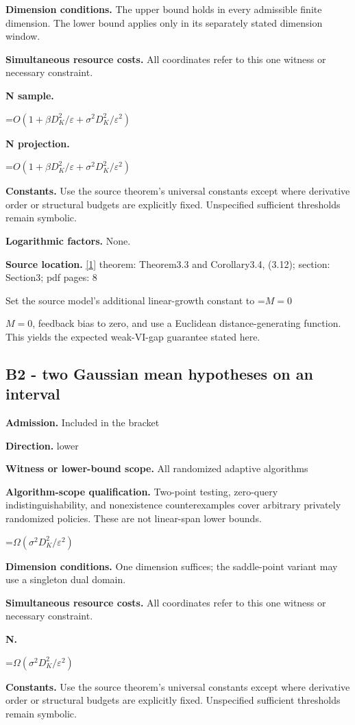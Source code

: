 \documentclass[10pt,a4paper]{article}
\newcommand{\AtlasMath}[1]{\par\begingroup\centering\setbox0=\hbox{$\displaystyle #1$}\ifdim\wd0>1.4\linewidth\typeout{ATLAS WIDE FORMULA: \the\wd0}\fi\ifdim\wd0>\linewidth\resizebox{\linewidth}{!}{\box0}\else\box0\fi\par\endgroup}
\newcommand{\AtlasInlineMath}[1]{\begingroup\setbox0=\hbox{$#1$}\ifdim\wd0>.4\linewidth\endgroup\AtlasMath{#1}\else\endgroup$#1$\fi}
\begin{document}
\textbf{Dimension conditions.} The upper bound holds in every admissible finite dimension. The lower bound applies only in its separately stated dimension window.

\textbf{Simultaneous resource costs.} All coordinates refer to this one witness or necessary constraint.

\textbf{N sample.}

\AtlasMath{O(1+\beta D_K^2/\varepsilon+\sigma^2D_K^2/\varepsilon^2)}
\textbf{N projection.}

\AtlasMath{O(1+\beta D_K^2/\varepsilon+\sigma^2D_K^2/\varepsilon^2)}
\textbf{Constants.} Use the source theorem’s universal constants except where derivative order or structural budgets are explicitly fixed. Unspecified sufficient thresholds remain symbolic.

\textbf{Logarithmic factors.} None.

\textbf{Source location.} \href{https://www.isye.gatech.edu/~nemirovs/SMP.pdf}{[1]} theorem: Theorem3.3 and Corollary3.4, (3.12); section: Section3; pdf pages: 8

Set the source model's additional linear-growth constant to \AtlasInlineMath{M=0}, feedback bias to zero, and use a Euclidean distance-generating function. This yields the expected weak-VI-gap guarantee stated here.

\subsection{B2 - two Gaussian mean hypotheses on an interval}
\textbf{Admission.} Included in the bracket

\textbf{Direction.} lower

\textbf{Witness or lower-bound scope.} All randomized adaptive algorithms

\textbf{Algorithm-scope qualification.} Two-point testing, zero-query indistinguishability, and nonexistence counterexamples cover arbitrary privately randomized policies. These are not linear-span lower bounds.

\AtlasMath{\Omega(\sigma^2D_K^2/\varepsilon^2)}
\textbf{Dimension conditions.} One dimension suffices; the saddle-point variant may use a singleton dual domain.

\textbf{Simultaneous resource costs.} All coordinates refer to this one witness or necessary constraint.

\textbf{N.}

\AtlasMath{\Omega(\sigma^2D_K^2/\varepsilon^2)}
\textbf{Constants.} Use the source theorem’s universal constants except where derivative order or structural budgets are explicitly fixed. Unspecified sufficient thresholds remain symbolic.
\end{document}
